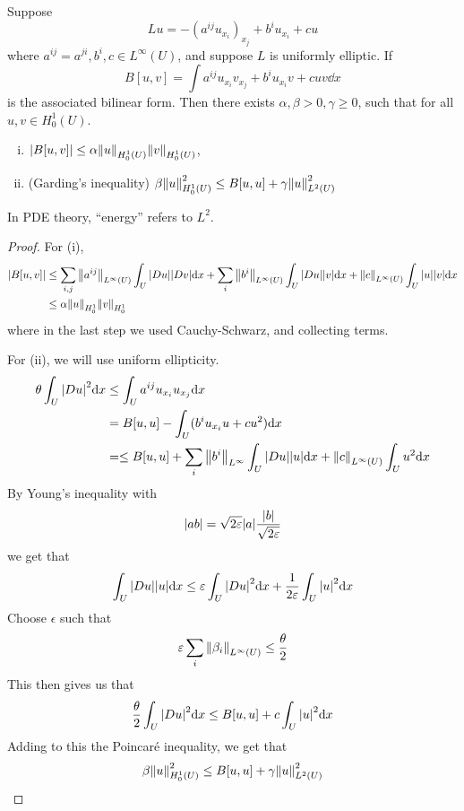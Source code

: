 \documentclass{article}
\begin{document}
\begin{theorem}
    Suppose
    \[Lu = -(a^{ij}u_{x_i})_{x_j} + b^iu_{x_i} + cu\]
    where \(a^{ij} = a^{ji}, b^i, c \in L^\infty(U)\), and suppose \(L\) is uniformly elliptic. If
    \[B[u, v] = \int a^{ij}u_{x_i}v_{x_j} + b^iu_{x_i}v + cuv \dd x\]
    is the associated bilinear form. Then there exists \(\alpha, \beta > 0, \gamma \ge 0\), such that for all \(u, v \in H_0^1(U)\).
    \begin{enumerate}[(i)]
        \item \(\abs{B[u, v]} \le \alpha\norm{u}_{H_0^1(U)}\norm{v}_{H_0^1(U)}\),
        \item (Garding's inequality) \(\beta\norm{u}^2_{H_0^1(U)} \le B[u, u] + \gamma\norm{u}_{L^2(U)}^2\)
    \end{enumerate}
\end{theorem}

\begin{remark}
    In PDE theory, ``energy'' refers to \(L^2\).
\end{remark}

\begin{proof}
    For (i),
    \begin{align*}
        \abs{B[u, v]} &\le \sum_{i, j}\norm{a^{ij}}_{L^\infty(U)}\int_U\abs{Du}\abs{Dv}\dd x + \sum_i \norm{b^i}_{L^\infty(U)}\int_U \abs{Du}\abs{v}\dd x + \norm{c}_{L^\infty(U)}\int_U \abs{u}\abs{v}\dd x \\
        &\le \alpha\norm{u}_{H^1_0}\norm{v}_{H^1_0}
    \end{align*}
    where in the last step we used Cauchy-Schwarz, and collecting terms.

    For (ii), we will use uniform ellipticity.
    \begin{align*}
        \theta \int_U \abs{Du}^2 \dd x &\le \int_U a^{ij}u_{x_i}u_{x_j} \dd x \\
        &= B[u, u] - \int_U(b^i u_{x_i}u + cu^2)\dd x\\
        &= \le B[u, u] + \sum_i \norm{b^i}_{L^\infty}\int_U \abs{Du}\abs{u}\dd x + \norm{c}_{L^\infty(U)}\int_U u^2 \dd x
    \end{align*}
    By Young's inequality with
    \[\abs{ab} = \sqrt{2\varepsilon}\abs{a}\frac{\abs{b}}{\sqrt{2\varepsilon}}\]
    we get that
    \[\int_U \abs{Du}\abs{u}\dd x \le \varepsilon\int_U\abs{Du}^2 \dd x + \frac{1}{2\varepsilon}\int_U \abs{u}^2 \dd x\]
    Choose \(\epsilon\) such that
    \[\varepsilon\sum_i\norm{\beta_i}_{L^\infty(U)} \le \frac{\theta}{2}\]
    This then gives us that
    \[\frac{\theta}{2} \int_U\abs{D u}^2 \dd x \le B[u, u] + c\int_U\abs{u}^2\dd x\]
    Adding to this the Poincar\'e inequality, we get that
    \[\beta\norm{u}^2_{H^1_0(U)} \le B[u, u] + \gamma\norm{u}^2_{L^2(U)}\]
\end{proof}
\end{document}
